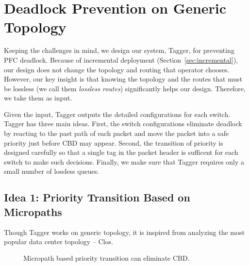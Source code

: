 \section{Deadlock Prevention on Generic Topology}\label{sec:generic}

Keeping the challenges in mind, we design our system, Tagger, for preventing PFC deadlock.
Because of incremental deployment (Section~\ref{sec:incremental}), our design does not change the 
topology and routing that operator chooses. However, our key insight is that knowing the topology 
and the routes that must be lossless (we call them {\em lossless routes}) significantly helps our design. 
Therefore, we take them as input. 

Given the input, Tagger outputs the detailed configurations for each switch. Tagger has three main ideas. 
First, the switch configurations eliminate deadlock by reacting to the past path of each packet and move the packet
into a safe priority just before CBD may appear. Second, the transition of priority is designed carefully so that 
a single tag in the packet header is sufficent for each switch to make such decisions.
Finally, we make sure that Tagger requires only a small number of lossless queues.

\subsection{Idea 1: Priority Transition Based on Micropaths} 

Though Tagger works on generic topology, it is inspired from analyzing the most popular data center topology -- Clos.

\begin{figure}[t]
	\centering
	
	
	
	\caption{Micropath based priority transition can eliminate CBD.}\label{fig:priority_transition}
\end{figure}



